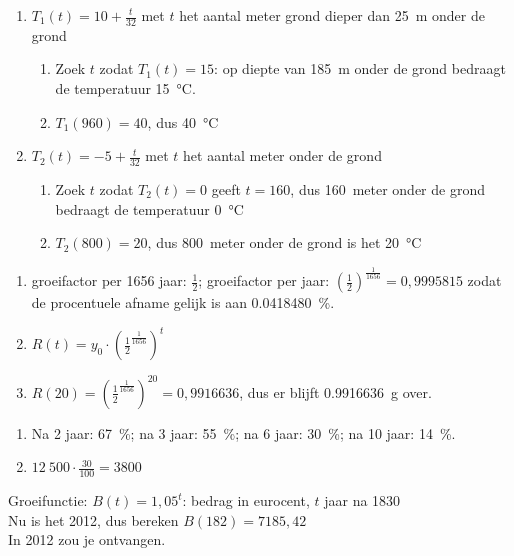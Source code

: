 \begin{Oplossing}{5.4}
\begin{enumerate}
\item
$T_1(t)=10+\frac{t}{32}$ met $t$ het aantal meter grond dieper dan \SI{25}{\meter} onder de grond
\begin{enumerate}
\item Zoek $t$ zodat $T_1(t)=15$: op diepte van \SI{185}{\meter} onder de grond bedraagt de temperatuur \SI{15}{\celsius}.
\item $T_1(960)=40$, dus \SI{40}{\celsius}
\end{enumerate}
\item $T_2(t)=-5+\frac{t}{32}$ met $t$ het aantal meter onder de grond
\begin{enumerate}
\item Zoek $t$ zodat $T_2(t)=0$ geeft $t=160$, dus \SI{160}{meter} onder de grond bedraagt de temperatuur \SI{0}{\celsius}
\item $T_2(800)=20$, dus \SI{800}{meter} onder de grond is het \SI{20}{\celsius}
\end{enumerate}
\end{enumerate}
\end{Oplossing}
\begin{Oplossing}{5.5}
\begin{enumerate}
\item groeifactor per 1656 jaar: $\frac12$; groeifactor per jaar: $\left(\frac{1}{2}\right)^\frac{1}{1656}=0,9995815$ zodat de procentuele afname gelijk is aan \SI{0,0418480}{\percent}.
\item $R(t)=y_0\cdot \left(\frac{1}{2}^\frac{1}{1656}\right)^t$
\item $R(20)=\left(\frac{1}{2}^\frac{1}{1656}\right)^{20}=0,9916636$, dus er blijft \SI{0.9916636}{\gram} over.
\end{enumerate}
\end{Oplossing}
\begin{Oplossing}{5.6}
\begin{enumerate}
\item Na 2 jaar: \SI{67}{\percent}; na 3 jaar: \SI{55}{\percent}; na 6 jaar: \SI{30}{\percent}; na 10 jaar: \SI{14}{\percent}.
\item $12~500\cdot\frac{30}{100}=3800$
\end{enumerate}
\end{Oplossing}
\begin{Oplossing}{5.7}
  Groeifunctie: $B(t)=1,05^t$: bedrag in eurocent, $t$ jaar na 1830\\
  Nu is het 2012, dus bereken $B(182)=7185,42$\\
  In 2012 zou je  ontvangen.
  
\end{Oplossing}
